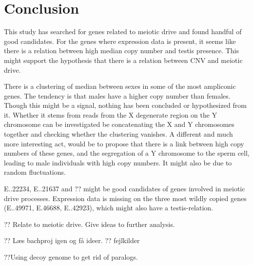 \section*{Conclusion}


This study has searched for genes related to meiotic drive and found handful of good candidates. For the genes where expression data is present, it seems like there is a relation between high median copy number and testis presence. This might support the hypothesis that there is a relation between CNV and meiotic drive.

There is a clustering of median between sexes in some of the most ampliconic genes. The tendency is that males have a higher copy number than females. Though this might be a signal, nothing has been concluded or hypothesized from it. Whether it stems from reads from the X degenerate region on the Y chromosome can be investigated be concatenating the X and Y chromosomes together and checking whether the clustering vanishes. A different and much more interesting act, would be to propose that there is a link between high copy numbers of these genes, and the segregation of a Y chromosome to the sperm cell, leading to male individuals with high copy numbers. It might also be due to random fluctuations.


E..22234, E..21637 and ?? might be good candidates of genes involved in meiotic drive processes. Expression data is missing on the three most wildly copied genes (E..49971, E.46688, E..42923), which might also have a testis-relation.



?? Relate to meiotic drive. Give ideas to further analysis.

?? Læs bachproj igen og få ideer.
?? fejlkilder






??Using decoy genome to get rid of paralogs.


